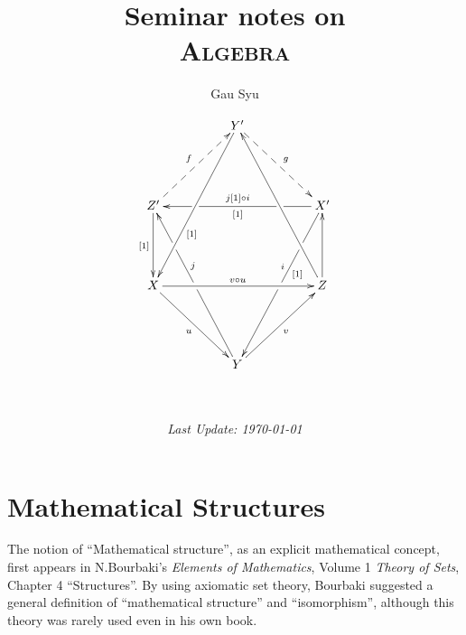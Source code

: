 %
%
%
%

%
%

%
%
%
%
\title{{\giant Seminar notes on}\\ \Giant\textsc{Algebra}}
\author{Gau Syu}
\date{
  \begin{gather*}
    \xymatrix@=5em{
    & Y' \ar@{-->}[dr]^g \ar[ddl]^(0.65){[1]} & \\
    Z' \ar@{-->}[ur]^f \ar[d]_{[1]} & &
        X' \ar[ll]_{j[1] \circ i}^{[1]}|(0.25)\hole|(0.75)\hole
           \ar[ddl]_(0.4)i^(0.4){[1]}|(0.25)\hole|(0.5)\hole \\
    X \ar[rr]^{v \circ u} \ar[dr]_u & &
        Z \ar[u] \ar[uul]\\
   & Y \ar[ur]_v \ar[uul]_(0.6)j|(0.5)\hole|(0.75)\hole &
    }\\
    \\
    \\
  \end{gather*}
\emph{\small Last Update: \today}}


\frontmatter
\maketitle
\dominitoc

\tableofcontents
\mainmatter
\pagestyle{plain}
\setcounter{minitocdepth}{2}
\part{Mathematical Structures}
  The notion of ``Mathematical structure'', as an explicit mathematical concept, first appears in N.Bourbaki's \emph{Elements of Mathematics}, Volume 1 \emph{Theory of Sets}, Chapter 4 ``Structures''. By using axiomatic set theory, Bourbaki suggested a general definition of ``mathematical structure'' and ``isomorphism'', although this theory was rarely used even in his own book.

